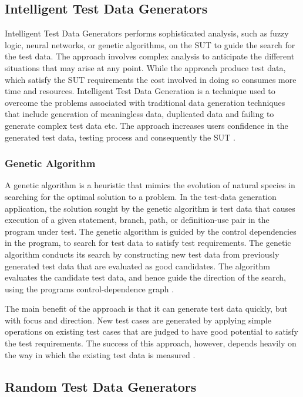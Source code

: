 \subsection{Intelligent Test Data Generators}
Intelligent Test Data Generators performs sophisticated analysis, such as fuzzy logic, neural networks, or genetic algorithms, on the SUT to guide the search for the test data. The approach involves complex analysis to anticipate the different situations that may arise at any point. While the approach produce test data, which satisfy the SUT requirements the cost involved in doing so consumes more time and resources. Intelligent Test Data Generation is a technique used to overcome the problems associated with traditional data generation techniques that include generation of meaningless data, duplicated data and failing to generate complex test data etc.  The approach increases users confidence in the generated test data, testing process and consequently the SUT \cite{ramamoorthy1975testing}.

\subsubsection{Genetic Algorithm}
A genetic algorithm is a heuristic that mimics the evolution of natural species in searching for the optimal solution to a problem. In the test-data generation application, the solution sought by the genetic algorithm is test data that causes execution of a given statement, branch, path, or definition-use pair in the program under test. The genetic algorithm is guided by the control dependencies in the program, to search for test data to satisfy test requirements. The genetic algorithm conducts its search by constructing new test data from previously generated test data that are evaluated as good candidates. The algorithm evaluates the candidate test data, and hence guide the direction of the search, using the programs control-dependence graph \cite{pargas1999test}.

The main benefit of the approach is that it can generate test data quickly, but with focus and direction. New test cases are generated by applying simple operations on existing test cases that are judged to have good potential to satisfy the test requirements. The success of this approach, however, depends heavily on the way in which the existing test data is measured \cite{pargas1999test}.


\subsection{Random Test Data Generators}

